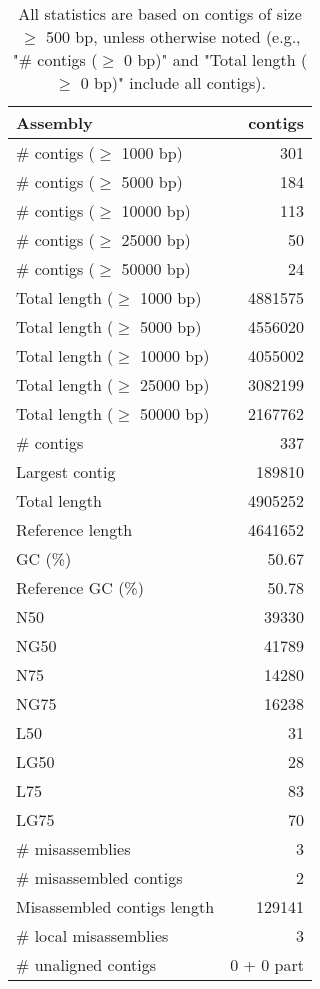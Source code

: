 \documentclass[12pt,a4paper]{article}
\begin{document}
\begin{table}[ht]
\begin{center}
\caption{All statistics are based on contigs of size $\geq$ 500 bp, unless otherwise noted (e.g., "\# contigs ($\geq$ 0 bp)" and "Total length ($\geq$ 0 bp)" include all contigs).}
\begin{tabular}{|l*{1}{|r}|}
\hline
Assembly & contigs \\ \hline
\# contigs ($\geq$ 1000 bp) & 301 \\ \hline
\# contigs ($\geq$ 5000 bp) & 184 \\ \hline
\# contigs ($\geq$ 10000 bp) & 113 \\ \hline
\# contigs ($\geq$ 25000 bp) & 50 \\ \hline
\# contigs ($\geq$ 50000 bp) & 24 \\ \hline
Total length ($\geq$ 1000 bp) & 4881575 \\ \hline
Total length ($\geq$ 5000 bp) & 4556020 \\ \hline
Total length ($\geq$ 10000 bp) & 4055002 \\ \hline
Total length ($\geq$ 25000 bp) & 3082199 \\ \hline
Total length ($\geq$ 50000 bp) & 2167762 \\ \hline
\# contigs & 337 \\ \hline
Largest contig & 189810 \\ \hline
Total length & 4905252 \\ \hline
Reference length & 4641652 \\ \hline
GC (\%) & 50.67 \\ \hline
Reference GC (\%) & 50.78 \\ \hline
N50 & 39330 \\ \hline
NG50 & 41789 \\ \hline
N75 & 14280 \\ \hline
NG75 & 16238 \\ \hline
L50 & 31 \\ \hline
LG50 & 28 \\ \hline
L75 & 83 \\ \hline
LG75 & 70 \\ \hline
\# misassemblies & 3 \\ \hline
\# misassembled contigs & 2 \\ \hline
Misassembled contigs length & 129141 \\ \hline
\# local misassemblies & 3 \\ \hline
\# unaligned contigs & 0 + 0 part \\ \hline

\end{tabular}
\end{center}
\end{table}
\end{document}
